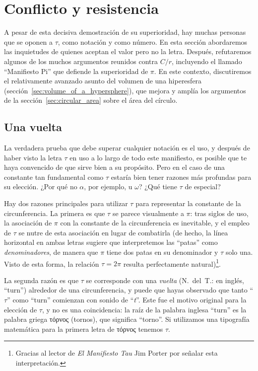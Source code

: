 

\section{Conflicto y resistencia} %
\label{sec:conflict_and_resistance}

A pesar de esta decisiva demostración de su superioridad, hay muchas personas que se oponen a $\tau$, como notación y como número. En esta sección abordaremos las inquietudes de quienes aceptan el valor pero no la letra. Después, refutaremos algunos de los muchos argumentos reunidos contra $C/r$, incluyendo el llamado ``Manifiesto Pi'' que defiende la superioridad de $\pi$. En este contexto, discutiremos el relativamente avanzado asunto del volumen de una hiperesfera (sección~\ref{sec:volume_of_a_hypersphere}), que mejora y amplía los argumentos de la sección~\ref{sec:circular_area} sobre el área del círculo.

  \subsection{Una vuelta} %
  \label{sec:one_turn}

La verdadera prueba que debe superar cualquier notación es el uso, y después de haber visto la letra $\tau$ en uso a lo largo de todo este manifiesto, es posible que te haya convencido de que sirve bien a su propósito. Pero en el caso de una constante tan fundamental como $\tau$ estaría bien tener razones más profundas para su elección. ¿Por qué no $\alpha$, por ejemplo, u $\omega$? ¿Qué tiene $\tau$ de especial?

Hay dos razones principales para utilizar $\tau$ para representar la constante de la circunferencia. La primera es que $\tau$ se parece visualmente a $\pi$: tras siglos de uso, la asociación de $\pi$ con la constante de la circunferencia es inevitable, y el empleo de $\tau$ se nutre de esta asociación en lugar de combatirla (de hecho, la línea horizontal en ambas letras sugiere que interpretemos las ``patas'' como \emph{denominadores}, de manera que $\pi$ tiene dos patas en su denominador y $\tau$ solo una. Visto de esta forma, la relación $\tau = 2\pi$ resulta perfectamente natural)\footnote{Gracias al lector de \emph{El Manifiesto Tau} Jim Porter por señalar esta interpretación.}.

La segunda razón es que $\tau$ se corresponde con una \emph{vuelta} (N.~del~T.: en inglés, ``turn'') alrededor de una circunferencia, y puede que hayas observado que tanto ``$\tau$'' como ``turn'' comienzan con sonido de ``\emph{t}''. Este fue el motivo original para la elección de $\tau$, y no es una coincidencia: la raíz de la palabra inglesa ``turn'' es la palabra griega τόρνος (tornos), que significa ``torno''. Si utilizamos una tipografía matemática para la primera letra de τόρνος tenemos $\tau$.

